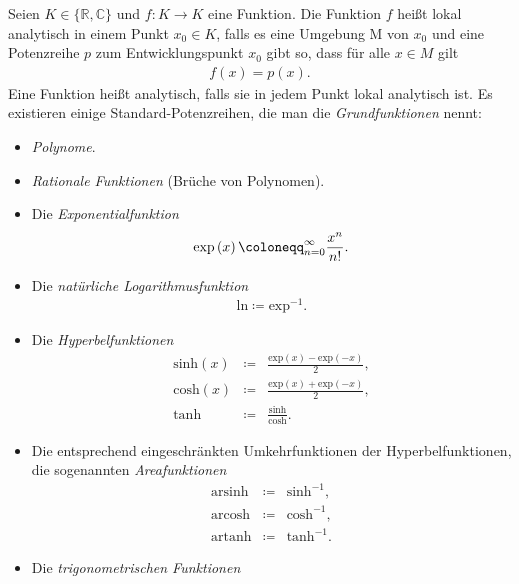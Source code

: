 \documentclass{book}
\renewcommand{\exp}{\text{exp}}
\renewcommand{\sinh}{\text{sinh}}
\renewcommand{\cosh}{\text{cosh}}
\renewcommand{\tanh}{\text{tanh}}
\newcommand{\arsinh}{\text{arsinh}}
\newcommand{\arcosh}{\text{arcosh}}
\newcommand{\artanh}{\text{artanh}}
\renewcommand{\ln}{\text{ln}}
\let\sum\relax
\DeclareMathOperator*{\sum}{\raisebox{-3.5pt}{\scalebox{2}{\rotatebox{1}{{\bask Σ}}}}}
\begin{document}
Seien $K\in\{\mathbb{R}, \mathbb{C}\}$ und $f:K\to K$ eine Funktion. Die Funktion $f$ heißt lokal analytisch in einem Punkt $x_0\in K$, falls es eine Umgebung M von $x_0$ und eine Potenzreihe $p$ zum Entwicklungspunkt $x_0$ gibt so, dass für alle $x\in M$ gilt
%
\begin{eqnarray}
f\left(x\right) = p\left(x\right).
\end{eqnarray}
%
Eine Funktion heißt analytisch, falls sie in jedem Punkt lokal analytisch ist. Es existieren einige Standard-Potenzreihen, die man die \textit{Grundfunktionen} nennt:
%
\begin{itemize}
\item \textit{Polynome}.
\item \textit{Rationale Funktionen} (Brüche von Polynomen).
\item Die \textit{Exponentialfunktion}
%
\begin{eqnarray}
\exp\left(x\right) \coloneqq \sum_{n = 0}^{\infty}\frac{x^n}{n!}.
\end{eqnarray}
%
\item Die \textit{natürliche Logarithmusfunktion}
%
\begin{eqnarray}
\ln \coloneqq \exp^{-1}.
\end{eqnarray}
%
\item Die \textit{Hyperbelfunktionen}
%
\begin{eqnarray}
\sinh\left(x\right) & \coloneqq & \frac{\exp\left(x\right) - \exp\left(-x\right)}{2},\\
\cosh\left(x\right) & \coloneqq & \frac{\exp\left(x\right) + \exp\left(-x\right)}{2},\\
\tanh & \coloneqq & \frac{\sinh}{\cosh}.
\end{eqnarray}
%
\item Die entsprechend eingeschränkten Umkehrfunktionen der Hyperbelfunktionen, die sogenannten \textit{Areafunktionen}
%
\begin{eqnarray}
\arsinh & \coloneqq & \sinh^{-1},\\
\arcosh & \coloneqq & \cosh^{-1},\\
\artanh & \coloneqq & \tanh^{-1}.
\end{eqnarray}
%
\item Die \textit{trigonometrischen Funktionen}

\end{itemize}
\end{document}
